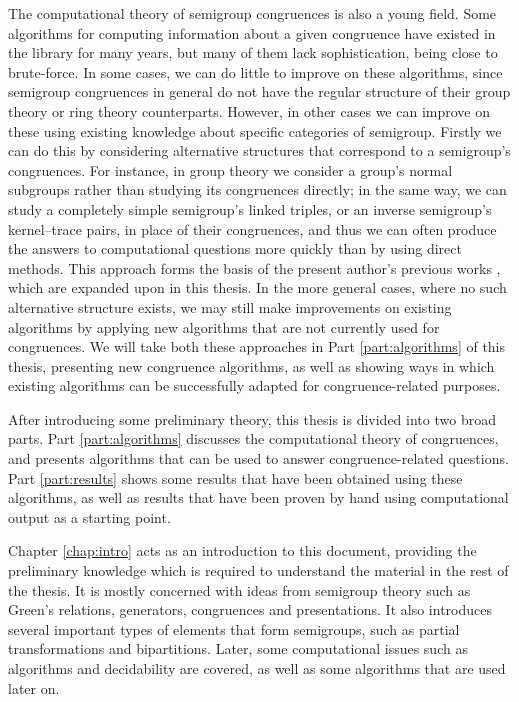 The computational theory of semigroup congruences is also a young field.  Some
algorithms for computing information about a given congruence have existed in
the \GAP{} library for many years, but many of them lack sophistication, being
close to brute-force.  In some cases, we can do little to improve on these
algorithms, since semigroup congruences in general do not have the regular
structure of their group theory or ring theory counterparts.  However, in other
cases we can improve on these using existing knowledge about specific categories
of semigroup.  Firstly we can do this by considering alternative structures that
correspond to a semigroup's congruences.  For instance, in group theory we
consider a group's normal subgroups rather than studying its congruences
directly; in the same way, we can study a completely simple semigroup's linked
triples, or an inverse semigroup's kernel--trace pairs, in place of their
congruences, and thus we can often produce the answers to computational
questions more quickly than by using direct methods.  This approach forms the
basis of the present author's previous works \cite{mtorpey_pre_msc,
  mtorpey_msc}, which are expanded upon in this thesis. In the more general
cases, where no such alternative structure exists, we may still make
improvements on existing algorithms by applying new algorithms that are not
currently used for congruences.  We will take both these approaches in Part
\ref{part:algorithms} of this thesis, presenting new congruence algorithms, as
well as showing ways in which existing algorithms can be successfully adapted
for congruence-related purposes.

After introducing some preliminary theory, this thesis is divided into two broad
parts.  Part \ref{part:algorithms} discusses the computational theory of
congruences, and presents algorithms that can be used to answer
congruence-related questions.  Part \ref{part:results} shows some results that
have been obtained using these algorithms, as well as results that have been
proven by hand using computational output as a starting point.

Chapter \ref{chap:intro} acts as an introduction to this document, providing the
preliminary knowledge which is required to understand the material in the rest
of the thesis.  It is mostly concerned with ideas from semigroup theory such as
Green's relations, generators, congruences and presentations.  It also
introduces several important types of elements that form semigroups, such as
partial transformations and bipartitions.  Later, some computational issues such
as algorithms and decidability are covered, as well as some algorithms that are
used later on.

